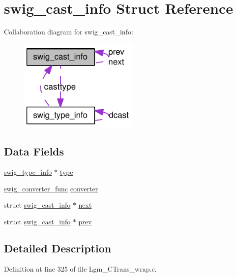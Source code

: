 \hypertarget{structswig__cast__info}{
\section{swig\_\-cast\_\-info Struct Reference}
\label{structswig__cast__info}
}
Collaboration diagram for swig\_\-cast\_\-info:\nopagebreak
\begin{figure}[H]
\begin{center}
\leavevmode
\includegraphics[width=166pt]{structswig__cast__info__coll__graph}
\end{center}
\end{figure}
\subsection*{Data Fields}
\begin{CompactItemize}
\item 
\hyperlink{structswig__type__info}{swig\_\-type\_\-info} $\ast$ \hyperlink{structswig__cast__info_a19bc251346ad9ae4ecb3b4e34545a5d}{type}
\item 
\hyperlink{_lgm___c_trans__wrap_8c_2c314f22b391bfcaff5a11f4b76f66ec}{swig\_\-converter\_\-func} \hyperlink{structswig__cast__info_b0c02ae209c86c1a920b1a6cbec7ec52}{converter}
\item 
struct \hyperlink{structswig__cast__info}{swig\_\-cast\_\-info} $\ast$ \hyperlink{structswig__cast__info_f4349454713002040fd3799016337b36}{next}
\item 
struct \hyperlink{structswig__cast__info}{swig\_\-cast\_\-info} $\ast$ \hyperlink{structswig__cast__info_d21cc20a49152bc851275a6747e89493}{prev}
\end{CompactItemize}


\subsection{Detailed Description}


Definition at line 325 of file Lgm\_\-CTrans\_\-wrap.c.

